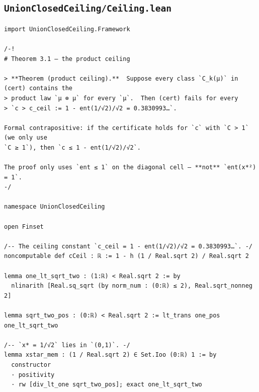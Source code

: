 \documentclass[11pt,a4paper]{article}
\theoremstyle{definition}
\theoremstyle{remark}
\begin{document}
\subsection{\texttt{UnionClosedCeiling/Ceiling.lean}}
\begin{Verbatim}[fontsize=\scriptsize,formatcom=\leanmono,samepage=false]
import UnionClosedCeiling.Framework

/-!
# Theorem 3.1 — the product ceiling

> **Theorem (product ceiling).**  Suppose every class `C_k(μ)` in (cert) contains the
> product law `μ ⊗ μ` for every `μ`.  Then (cert) fails for every
> `c > c_ceil := 1 - ent(1/√2)/√2 = 0.3830993…`.

Formal contrapositive: if the certificate holds for `c` with `C > 1` (we only use
`C ≥ 1`), then `c ≤ 1 - ent(1/√2)/√2`.

The proof only uses `ent ≤ 1` on the diagonal cell — **not** `ent(x*²) = 1`.
-/

namespace UnionClosedCeiling

open Finset

/-- The ceiling constant `c_ceil = 1 - ent(1/√2)/√2 = 0.3830993…`. -/
noncomputable def cCeil : ℝ := 1 - h (1 / Real.sqrt 2) / Real.sqrt 2

lemma one_lt_sqrt_two : (1:ℝ) < Real.sqrt 2 := by
  nlinarith [Real.sq_sqrt (by norm_num : (0:ℝ) ≤ 2), Real.sqrt_nonneg 2]

lemma sqrt_two_pos : (0:ℝ) < Real.sqrt 2 := lt_trans one_pos one_lt_sqrt_two

/-- `x* = 1/√2` lies in `(0,1)`. -/
lemma xstar_mem : (1 / Real.sqrt 2) ∈ Set.Ioo (0:ℝ) 1 := by
  constructor
  · positivity
  · rw [div_lt_one sqrt_two_pos]; exact one_lt_sqrt_two


\end{Verbatim}
\end{document}
